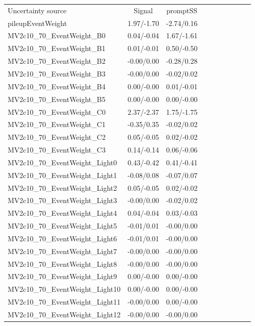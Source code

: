 \begin{table}[h]
\scriptsize
\begin{center}
\begin{tabular}{l|ccccccccc}
\hline
\hline
Uncertainty source &Signal &promptSS \\
pileupEventWeight &1.97/-1.70 &-2.74/0.16 \\
MV2c10\_70\_EventWeight\_B0 &0.04/-0.04 &1.67/-1.61 \\
MV2c10\_70\_EventWeight\_B1 &0.01/-0.01 &0.50/-0.50 \\
MV2c10\_70\_EventWeight\_B2 &-0.00/0.00 &-0.28/0.28 \\
MV2c10\_70\_EventWeight\_B3 &-0.00/0.00 &-0.02/0.02 \\
MV2c10\_70\_EventWeight\_B4 &0.00/-0.00 &0.01/-0.01 \\
MV2c10\_70\_EventWeight\_B5 &0.00/-0.00 &0.00/-0.00 \\
MV2c10\_70\_EventWeight\_C0 &2.37/-2.37 &1.75/-1.75 \\
MV2c10\_70\_EventWeight\_C1 &-0.35/0.35 &-0.02/0.02 \\
MV2c10\_70\_EventWeight\_C2 &0.05/-0.05 &0.02/-0.02 \\
MV2c10\_70\_EventWeight\_C3 &0.14/-0.14 &0.06/-0.06 \\
MV2c10\_70\_EventWeight\_Light0 &0.43/-0.42 &0.41/-0.41 \\
MV2c10\_70\_EventWeight\_Light1 &-0.08/0.08 &-0.07/0.07 \\
MV2c10\_70\_EventWeight\_Light2 &0.05/-0.05 &0.02/-0.02 \\
MV2c10\_70\_EventWeight\_Light3 &-0.00/0.00 &-0.02/0.02 \\
MV2c10\_70\_EventWeight\_Light4 &0.04/-0.04 &0.03/-0.03 \\
MV2c10\_70\_EventWeight\_Light5 &-0.01/0.01 &-0.00/0.00 \\
MV2c10\_70\_EventWeight\_Light6 &-0.01/0.01 &-0.00/0.00 \\
MV2c10\_70\_EventWeight\_Light7 &-0.00/0.00 &-0.00/0.00 \\
MV2c10\_70\_EventWeight\_Light8 &-0.00/0.00 &-0.00/0.00 \\
MV2c10\_70\_EventWeight\_Light9 &0.00/-0.00 &0.00/-0.00 \\
MV2c10\_70\_EventWeight\_Light10 &0.00/-0.00 &0.00/-0.00 \\
MV2c10\_70\_EventWeight\_Light11 &-0.00/0.00 &0.00/-0.00 \\
MV2c10\_70\_EventWeight\_Light12 &-0.00/0.00 &-0.00/0.00 \\

\end{tabular}
\end{center}
\end{table}
